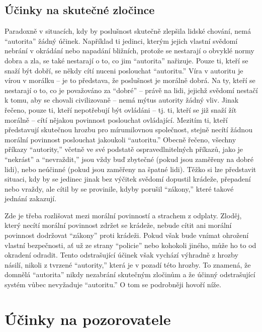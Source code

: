 \documentclass{book}
\begin{document}
\section{Účinky na skutečné zločince}

Paradoxně v situacích, kdy by poslušnost skutečně zlepšila lidské chování, nemá \enquote{autorita} žádný účinek. Například ti jedinci, kterým jejich vlastní svědomí nebrání v okrádání nebo napadání bližních, protože se nestarají o obvyklé normy dobra a zla, se také nestarají o to, co jim \enquote{autorita} nařizuje. Pouze ti, kteří se snaží být dobří, se někdy cítí nuceni poslouchat \enquote{autoritu.} Víra v autoritu je vírou v morálku -- je to představa, že poslušnost je morálně dobrá. Na ty, kteří se nestarají o to, co je považováno za \enquote{dobré} -- právě na lidi, jejichž svědomí nestačí k tomu, aby se chovali civilizovaně -- nemá mýtus autority žádný vliv. Jinak řečeno, pouze ti, kteří nepotřebují být ovládáni -- tj. ti, kteří se již snaží žít morálně -- cítí nějakou povinnost poslouchat ovládající. Mezitím ti, kteří představují skutečnou hrozbu pro mírumilovnou společnost, stejně necítí žádnou morální povinnost poslouchat jakoukoli \enquote{autoritu.} Obecně řečeno, všechny příkazy \enquote{autority,} včetně ve své podstatě ospravedlnitelných příkazů, jako je \enquote{nekrást} a \enquote{nevraždit,} jsou vždy buď zbytečné (pokud jsou zaměřeny na dobré lidi), nebo neúčinné (pokud jsou zaměřeny na špatné lidi). Těžko si lze představit situaci, kdy by se jedinec jinak bez výčitek svědomí dopustil krádeže, přepadení nebo vraždy, ale cítil by se provinile, kdyby porušil \enquote{zákony,} které takové jednání zakazují.

Zde je třeba rozlišovat mezi morální povinností a strachem z odplaty. Zloděj, který necítí morální povinnost zdržet se krádeže, nebude cítit ani morální povinnost dodržovat \enquote{zákony} proti krádeži. Pokud však bude vnímat ohrožení vlastní bezpečnosti, ať už ze strany \enquote{policie} nebo kohokoli jiného, může ho to od okradení odradit. Tento odstrašující účinek však vychází výhradně z hrozby násilí, nikoli z tvrzené \enquote{autority,} která je v pozadí této hrozby. To znamená, že domnělá \enquote{autorita} nikdy nezabrání skutečným zločinům a že účinný odstrašující systém vůbec nevyžaduje \enquote{autoritu.} O tom se podrobněji hovoří níže.

\chapter{Účinky na pozorovatele}
\end{document}

